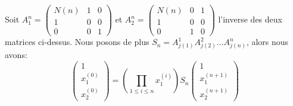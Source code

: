 \documentclass[12pt]{article}
\theoremstyle{plain}%
\theoremstyle{definition}
\theoremstyle{remark}
\begin{document}
Soit $A_1^n=\begin{pmatrix} N(n) & 1 & 0 \\1 & 0 & 0 \\0 & 0 & 1 \end{pmatrix}$ et $A_2^n=\begin{pmatrix} N(n) & 0 & 1 \\1 & 0 & 0 \\0 & 1 & 0 \end{pmatrix}$ l'inverse des deux matrices ci-dessus. Nous posons de plus $S_n=A_{j(1)}^1 A_{j(2)}^2 ... A_{j(n)}^n$, alors nous avons:$$
\begin{pmatrix} 1 \\ x_1^{(0)} \\ x_2^{(0)} \end{pmatrix} = (\prod_{1 \leq i \leq n} x_1^{(i)})S_n \begin{pmatrix} 1 \\ x_1^{(n+1)} \\ x_2^{(n+1)} \end{pmatrix}
$$
\end{document}
